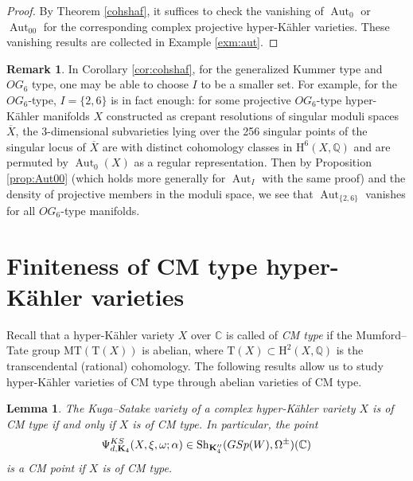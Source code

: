 \documentclass[11pt,reqno,oneside]{amsart}
\numberwithin{equation}{section}
\newtheorem{lemma}[theorem]{Lemma}
\theoremstyle{definition}
\newtheorem{remark}[theorem]{Remark}
\DeclareMathOperator{\Aut}{Aut}
\newcommand{\KS}{{\rm KS}}
\newcommand{\GSp}{{\rm GSp}}
\newcommand{\Sh}{\mathrm{Sh}}
\newcommand\rH{\mathrm{H}}
\newcommand{\rT}{\mathrm{T}}
\newcommand{\CC}{\mathbb{C}}
\newcommand{\QQ}{\mathbb{Q}}
\begin{document}
\begin{proof}
By Theorem \ref{cohshaf}, it suffices to check the vanishing of $\Aut_0$ or $\Aut_{00}$ for the corresponding complex projective hyper-Kähler varieties. These vanishing results are collected in Example \ref{exm:aut}.
\end{proof}
\begin{remark}
In Corollary \ref{cor:cohshaf}, for the generalized Kummer type and $OG_6$ type, one may be able to choose $I$ to be a smaller set. For example, for the $OG_6$-type, $I=\{2, 6\}$ is in fact enough: for some projective $OG_6$-type hyper-Kähler manifolds $X$ constructed as crepant resolutions of singular moduli spaces $\overline{X}$, the 3-dimensional subvarieties lying over the 256 singular points of the singular locus of $\overline{X}$ are with distinct cohomology classes in $\rH^6(X,\QQ)$ and are permuted by $\Aut_0(X)$ as a regular representation. Then by Proposition \ref{prop:Aut00} (which holds more generally for $\Aut_I$ with the same proof) and the density of projective members in the moduli space, we see that $\Aut_{\{2, 6\}}$ vanishes for all $OG_6$-type manifolds.
\end{remark}




\section{Finiteness of CM type hyper-Kähler varieties}  
\label{sec:FiniteCM}
Recall that a hyper-Kähler variety $X$ over $\CC$ is called of \emph{CM type} if the Mumford--Tate group $\mathrm{MT}(\rT(X))$ is abelian, where $\rT(X)\subset \rH^2(X, \QQ)$ is the transcendental (rational) cohomology. The following results allow us to study hyper-Kähler varieties of CM type through abelian varieties of CM type. 
\begin{lemma}\label{KS-CM}
 The Kuga--Satake variety of a complex hyper-Kähler variety $X$ is of CM type if and only if $X$ is of CM type. In particular, the point
 \[
 \Psi^{\KS}_{d,\mathbf{K}_4}(X,\xi,\omega; \alpha) \in \Sh_{\mathbf{K}''_4}(\GSp(W), \Omega^{\pm})(\CC)
 \]
is a CM point if $X$ is of CM type. 
\end{lemma}
\end{document}
